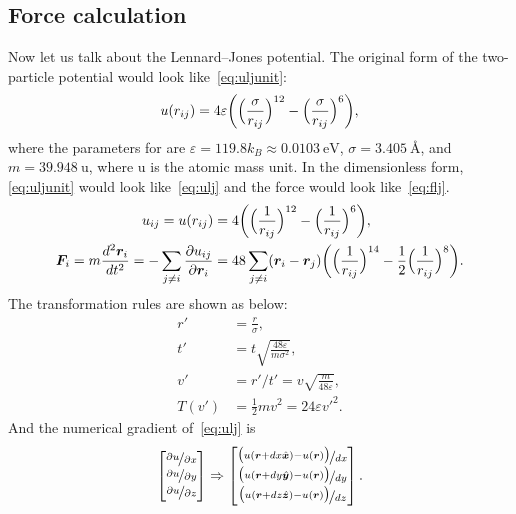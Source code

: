\subsection{Force calculation}\label{ssec:force}

Now let us talk about the Lennard--Jones potential.
The original form of the two-particle potential would look like~\eqref{eq:uljunit}:
%
\begin{equation}\label{eq:uljunit}
    u(r_{ij}) = 4 \varepsilon \biggl( \Bigl( \frac{ \sigma }{ r_{ij} } \Bigr)^{12}
    -\Bigl( \frac{ \sigma }{ r_{ij} } \Bigr)^6 \biggr),
\end{equation}
%
where the parameters for  are $\varepsilon = 119.8 k_B \approx \SI{0.0103}{\electronvolt}$,
$\sigma = \SI{3.405}{\angstrom}$, and $m = \SI{39.948}{\atomicmassunit}$, where
$\si{\atomicmassunit}$ is the atomic mass unit.
In the dimensionless form,
\eqref{eq:uljunit} would look like~\eqref{eq:ulj} and the force would
look like~\eqref{eq:flj}.
%
\begin{align}
    u_{ij} = u(r_{ij}) & = 4 \biggl( \Bigl( \frac{ 1 }{ r_{ij} } \Bigr)^{12}
    -\Bigl( \frac{ 1 }{ r_{ij} } \Bigr)^6 \biggr), \label{eq:ulj}            \\
    \bm{F}_i = m\frac{ d^2 \bm{r}_i }{ d t^2 } = -\sum_{j \neq i}\frac{ \partial u_{ij} }{ \partial \bm{r}_i }
                       & = 48\sum_{j \neq i} (\bm{r}_i - \bm{r}_j)
    \biggl( \Bigl( \frac{ 1 }{ r_{ij} } \Bigr)^{14}
    -\frac{ 1 }{ 2 } \Bigl( \frac{ 1 }{ r_{ij} } \Bigr)^8 \biggr). \label{eq:flj}
\end{align}
%
The transformation rules are shown as below:
%
\begin{align}
    r'    & = \frac{ r }{ \sigma },                                          \\
    t'    & = t \sqrt{\frac{ 48 \varepsilon }{ m \sigma^2 }},                \\
    v'    & = r' / t' = v \sqrt{\frac{ m }{ 48 \varepsilon }},               \\
    T(v') & = \frac{ 1 }{ 2 } m v^2 = 24 \varepsilon v'^2.\label{eq:kinetic}
\end{align}
%
And the numerical gradient of~\eqref{eq:ulj} is
%
\begin{equation}\label{eq:dudr}
    \begin{bmatrix}
        \nicefrac{ \partial u }{ \partial x } \\
        \nicefrac{ \partial u }{ \partial y } \\
        \nicefrac{ \partial u }{ \partial z }
    \end{bmatrix}
    \Rightarrow
    \begin{bmatrix}
        \nicefrac{ \bigl( u(\bm{r} + dx \hat{\bm{x}}) - u(\bm{r}) \bigr) }{ dx } \\
        \nicefrac{ \bigl( u(\bm{r} + dy \hat{\bm{y}}) - u(\bm{r}) \bigr) }{ dy } \\
        \nicefrac{ \bigl( u(\bm{r} + dz \hat{\bm{z}}) - u(\bm{r}) \bigr) }{ dz }
    \end{bmatrix}.
\end{equation}
